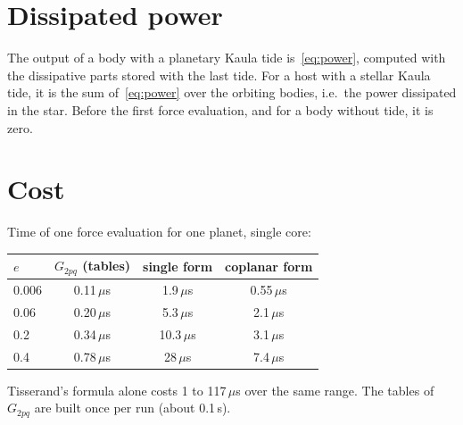 \section{Dissipated power}\label{sec:pos-power}
The output  of a body with a planetary Kaula tide is~\eqref{eq:power}, computed with the dissipative parts stored with the last tide. For a host with a stellar Kaula tide, it is the sum of~\eqref{eq:power} over the orbiting bodies, i.e.\ the power dissipated in the star. Before the first force evaluation, and for a body without tide, it is zero.

\section{Cost}\label{sec:pos-cost}
Time of one force evaluation for one planet, single core:
\begin{center}\small
\begin{tabular}{lccc}\toprule
$e$ & $G_{2pq}$ (tables) & single form & coplanar form\\\midrule
0.006 & 0.11\,$\mu$s & 1.9\,$\mu$s & 0.55\,$\mu$s\\
0.06 & 0.20\,$\mu$s & 5.3\,$\mu$s & 2.1\,$\mu$s\\
0.2 & 0.34\,$\mu$s & 10.3\,$\mu$s & 3.1\,$\mu$s\\
0.4 & 0.78\,$\mu$s & 28\,$\mu$s & 7.4\,$\mu$s\\\bottomrule
\end{tabular}
\end{center}
Tisserand's formula alone costs 1 to 117\,$\mu$s over the same range. The tables of $G_{2pq}$ are built once per run (about 0.1\,s).

